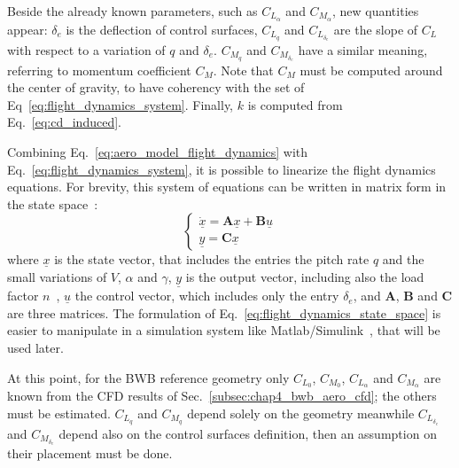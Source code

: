 Beside the already known parameters, such as $C_{L_{\alpha}}$ and $C_{M_{\alpha}}$, new quantities appear: $\delta_{e}$ is the deflection of control surfaces, $C_{L_{q}}$ and $C_{L_{\delta_{e}}}$ are the slope of $C_L$ with respect to a variation of $q$ and $\delta_{e}$. 
$C_{M_{q}}$ and $C_{M_{\delta_{e}}}$ have a similar meaning, referring to momentum coefficient $C_M$. 
Note that $C_M$ must be computed around the center of gravity, to have coherency with the set of Eq~\eqref{eq:flight_dynamics_system}. 
Finally, $k$ is computed from Eq.~\eqref{eq:cd_induced}.

Combining Eq.~\eqref{eq:aero_model_flight_dynamics} with Eq.~\eqref{eq:flight_dynamics_system}, it is possible to linearize the flight dynamics equations. 
For brevity, this system of equations can be written in matrix form in the state space~\cite{bib:kuethe}:
\begin{equation}
	\label{eq:flight_dynamics_state_space}
	\left\{ \begin{array}{l}
		\dot{\underline{x}} = \mathbf{A}\underline{x} + \mathbf{B}\underline{u} \\
		\underline{y} = \mathbf{C}\underline{x}
		\end{array} \right .
\end{equation}
where $\underline{x}$ is the state vector, that includes the entries the pitch rate $q$ and the small variations of $V$, $\alpha$ and $\gamma$, $\underline{y}$ is the output vector, including also the load factor $n$~\cite{bib:megson}, $\underline{u}$ the control vector, which includes only the entry $\delta_{e}$, and $\mathbf{A}$, $\mathbf{B}$ and $\mathbf{C}$ are three matrices. 
The formulation of Eq.~\eqref{eq:flight_dynamics_state_space} is easier to manipulate in a simulation system like Matlab/Simulink~\cite{bib:simulink}, that will be used later. 

At this point, for the BWB reference geometry only $C_{L_{0}}$, $C_{M_{0}}$, $C_{L_{\alpha}}$ and $C_{M_{\alpha}}$ are known from the CFD results of Sec.~\ref{subsec:chap4_bwb_aero_cfd}; the others must be estimated. 
$C_{L_{q}}$ and $C_{M_{q}}$ depend solely on the geometry meanwhile $C_{L_{\delta_{e}}}$ and $C_{M_{\delta_{e}}}$ depend also on the control surfaces definition, then an assumption on their placement must be done. 

